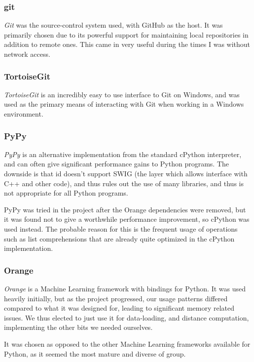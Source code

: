 \documentclass[a4paper,11pt]{report}
\begin{document}
\subsubsection*{git}
\emph{Git}\citep{prog:git} was the source-control system used, with GitHub as the host. It was primarily chosen due to its powerful support for maintaining local repositories in addition to remote ones. This came in very useful during the times I was without network access.

\subsubsection*{TortoiseGit}
\emph{TortoiseGit}\citep{prog:tortoisegit} is an incredibly easy to use interface to Git on Windows, and was used as the primary means of interacting with Git when working in a Windows environment.

\subsubsection*{PyPy}
\emph{PyPy}\citep{prog:pypy} is an alternative implementation from the standard cPython interpreter, and can often give significant performance gains to Python programs. The downside is that id doesn't support SWIG (the layer which allows interface with C++ and other code), and thus rules out the use of many libraries, and thus is not appropriate for all Python programs.

PyPy was tried in the project after the Orange dependencies were removed, but it was found not to give a worthwhile performance improvement, so cPython was used instead. The probable reason for this is the frequent usage of operations such as list comprehensions that are already quite optimized in the cPython implementation.

\subsubsection*{Orange}
\emph{Orange}\citep{prog:orange} is a Machine Learning framework with bindings for Python. It was used heavily initially, but as the project progressed, our usage patterns differed compared to what it was designed for, leading to significant memory related issues. We thus elected to just use it for data-loading, and distance computation, implementing the other bits we needed ourselves.

It was chosen as opposed to the other Machine Learning frameworks available for Python, as it seemed the most mature and diverse of group.
\end{document}
